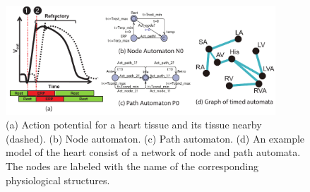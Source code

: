 %
\begin{figure}[!t]
	\centering
	\includegraphics[width=0.9\textwidth]{figs/init_abs.pdf}
	\vspace{-10pt}
	\caption{\small (a) Action potential for a heart tissue and its tissue nearby (dashed). (b) Node automaton. (c) Path automaton. (d) An example model of the heart consist of a network of node and path automata. The nodes are labeled with the name of the corresponding physiological structures.}
	\vspace{-15pt}
	\label{fig:nodepathTA}
\end{figure}

